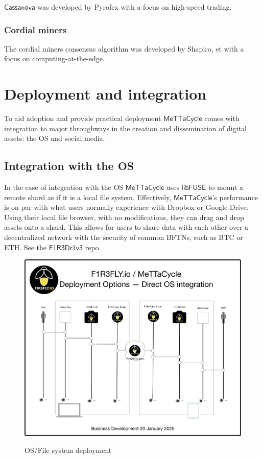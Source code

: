 \documentclass{article}
\newcommand{\MC}{\mathsf{MeTTaCycle}}
\newcommand{\FD}{\mathsf{F1R3Dr1v3}}
\begin{document}
$\mathsf{Cassanova}$ was developed by Pyrofex with a focus on
high-speed trading.

\subsubsection{Cordial miners}

The cordial miners consensus algorithm was developed by Shapiro, et
with a focus on computing-at-the-edge.

\section{Deployment and integration}
\label{Deployment and integration}

To aid adoption and provide practical deployment $\MC$ comes with
integration to major throughways in the creation and dissemination of
digital assets: the OS and social media.

\subsection{Integration with the OS}

In the case of integration with the OS $\MC$ uses
$\mathsf{libFUSE}$ to mount a remote shard as if it is a local file
system. Effectively, $\MC$'s performance is on par with what
users normally experience with Dropbox or Google Drive. Using their
local file browser, with no modifications, they can drag and drop
assets onto a shard. This allows for users to share data with each
other over a decentralized network with the security of common BFTNs,
such as BTC or ETH. See the $\FD$ repo.

\begin{figure}
  \centering
  \includegraphics[scale=0.15]{MeTTaCycleArchitecture2025OSDeployment.pdf} \\
  \caption{OS/File system deployment}
  \label{MCArch2025OSDeployment}
\end{figure}
\end{document}
